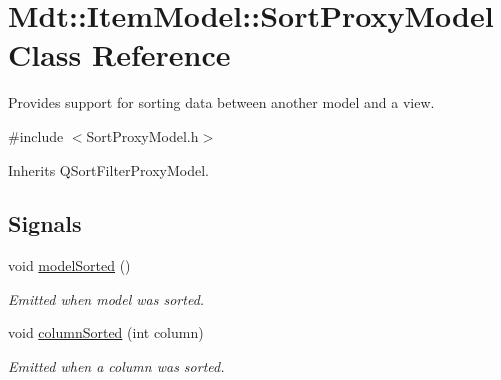 \hypertarget{class_mdt_1_1_item_model_1_1_sort_proxy_model}{}\section{Mdt\+:\+:Item\+Model\+:\+:Sort\+Proxy\+Model Class Reference}
\label{class_mdt_1_1_item_model_1_1_sort_proxy_model}


Provides support for sorting data between another model and a view.  




{\ttfamily \#include $<$Sort\+Proxy\+Model.\+h$>$}



Inherits Q\+Sort\+Filter\+Proxy\+Model.

\subsection*{Signals}
\begin{DoxyCompactItemize}
\item 
void \hyperlink{class_mdt_1_1_item_model_1_1_sort_proxy_model_a082be5eeb363f73088ef22f8df646be2}{model\+Sorted} ()
\begin{DoxyCompactList}\small\item\em Emitted when model was sorted. \end{DoxyCompactList}\item 
void \hyperlink{class_mdt_1_1_item_model_1_1_sort_proxy_model_a76e7daa6ca9a63cecd0b9bac99902c7a}{column\+Sorted} (int column)\hypertarget{class_mdt_1_1_item_model_1_1_sort_proxy_model_a76e7daa6ca9a63cecd0b9bac99902c7a}{}\label{class_mdt_1_1_item_model_1_1_sort_proxy_model_a76e7daa6ca9a63cecd0b9bac99902c7a}

\begin{DoxyCompactList}\small\item\em Emitted when a column was sorted. \end{DoxyCompactList}\end{DoxyCompactItemize}
